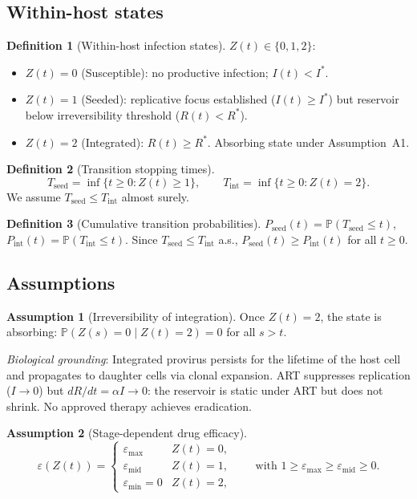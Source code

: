 \documentclass[11pt]{article}
\theoremstyle{definition}
\newtheorem{definition}{Definition}[section]
\newtheorem{assumption}{Assumption}[section]
\theoremstyle{remark}
\newcommand{\Tseed}{T_{\text{seed}}}
\newcommand{\Tint}{T_{\text{int}}}
\newcommand{\Pseed}{P_{\text{seed}}}
\newcommand{\Pint}{P_{\text{int}}}
\newcommand{\emax}{\varepsilon_{\max}}
\newcommand{\emid}{\varepsilon_{\text{mid}}}
\newcommand{\emin}{\varepsilon_{\min}}
\begin{document}
\subsection{Within-host states}

\begin{definition}[Within-host infection states]
$Z(t) \in \{0, 1, 2\}$:
\begin{itemize}[nosep,leftmargin=2em]
    \item $Z(t) = 0$ (Susceptible): no productive infection; $I(t) < I^{*}$.
    \item $Z(t) = 1$ (Seeded): replicative focus established ($I(t) \geq I^{*}$) but reservoir below irreversibility threshold ($R(t) < R^{*}$).
    \item $Z(t) = 2$ (Integrated): $R(t) \geq R^{*}$. Absorbing state under Assumption~A1.
\end{itemize}
\end{definition}

\begin{definition}[Transition stopping times]
\[
\Tseed = \inf\{t \geq 0 : Z(t) \geq 1\}, \qquad
\Tint  = \inf\{t \geq 0 : Z(t) = 2\}.
\]
We assume $\Tseed \leq \Tint$ almost surely.
\end{definition}

\begin{definition}[Cumulative transition probabilities]
$\Pseed(t) = \mathbb{P}(\Tseed \leq t)$, $\Pint(t) = \mathbb{P}(\Tint \leq t)$. Since $\Tseed \leq \Tint$ a.s., $\Pseed(t) \geq \Pint(t)$ for all $t \geq 0$.
\end{definition}

\subsection{Assumptions}

\begin{assumption}[Irreversibility of integration]
Once $Z(t) = 2$, the state is absorbing: $\mathbb{P}(Z(s) = 0 \mid Z(t) = 2) = 0$ for all $s > t$.

\textit{Biological grounding}: Integrated provirus persists for the lifetime of the host cell and propagates to daughter cells via clonal expansion. ART suppresses replication ($I \to 0$) but $dR/dt = \alpha I \to 0$: the reservoir is static under ART but does not shrink. No approved therapy achieves eradication.
\end{assumption}

\begin{assumption}[Stage-dependent drug efficacy]
\[
\varepsilon(Z(t)) =
\begin{cases}
\emax & Z(t) = 0,\\
\emid & Z(t) = 1,\\
\emin = 0 & Z(t) = 2,
\end{cases}
\qquad
\text{with } 1 \geq \emax \geq \emid \geq 0.
\]
\end{assumption}
\end{document}
